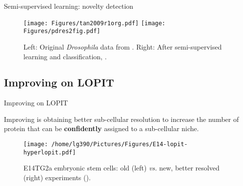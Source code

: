 \begin{frame}{Semi-supervised learning: novelty detection}
  \begin{figure}
    \texttt{[image: Figures/tan2009r1org.pdf]}
    \texttt{[image: Figures/pdres2fig.pdf]}
    \caption{Left: Original \textit{Drosophila} data from
      \cite{Tan2009}. Right: After semi-supervised learning and
      classification, \cite{Breckels:2013}.}
  \end{figure} 
\end{frame}


\subsection{Improving on LOPIT}

\begin{frame}{Improving on LOPIT}

  Improving is obtaining better sub-cellular resolution to increase
  the number of protein that can be \textbf{confidently} assigned to a
  sub-cellular niche.
  
  \begin{figure}[h]
    \centering
    \texttt{[image: /home/lg390/Pictures/Figures/E14-lopit-hyperlopit.pdf]}
    \caption{E14TG2a embryonic stem cells: old (left) \textit{vs.} new, better
      resolved (right) experiments (\cite{Christoforou:2016}).}
  \end{figure}
  
\end{frame}  

